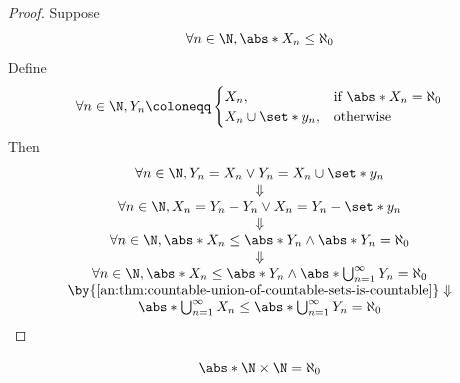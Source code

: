 \begin{proof}
  Suppose
  \[
    \forall n \in \N, \abs*{X_{n}} \leq \aleph_{0}
  \]
  Define
  \[
    \forall n \in \N, Y_{n} \coloneqq
    \begin{cases}
      X_{n},                   & \text{if } \abs*{X_{n}} = \aleph_{0} \\
      X_{n} \cup \set*{y_{n}}, & \text{otherwise}
    \end{cases}
  \]
  Then
  \[
    \begin{array}{c}
      \forall n \in \N, Y_{n} = X_{n} \lor Y_{n} = X_{n} \cup \set*{y_{n}}                                      \\
      \Downarrow                                                                                                \\
      \forall n \in \N, X_{n} = Y_{n} - Y_{n} \lor X_{n} = Y_{n} - \set*{y_{n}}                                 \\
      \Downarrow                                                                                                \\
      \forall n \in \N, \abs*{X_{n}} \leq \abs*{Y_{n}} \land \abs*{Y_{n}} = \aleph_{0}                          \\
      \Downarrow                                                                                                \\
      \forall n \in \N, \abs*{X_{n}} \leq \abs*{Y_{n}} \land \abs*{\bigcup_{n = 1}^{\infty} Y_{n}} = \aleph_{0} \\
      \by{\Cref{an:thm:countable-union-of-countable-sets-is-countable}} \Downarrow                              \\
      \abs*{\bigcup_{n = 1}^{\infty} X_{n}} \leq \abs*{\bigcup_{n = 1}^{\infty} Y_{n}} = \aleph_{0}
    \end{array}
  \]
\end{proof}

\bigskip

\begin{lemma} \label{an:lem:N-times-N-is-countable}
  \[
    \abs*{\N \times \N} = \aleph_{0}
  \]
\end{lemma}
